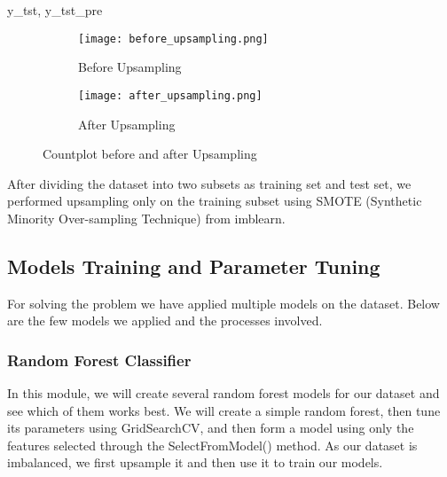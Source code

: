 y_tst, y_tst_pre\documentclass[12pt]{article}
\begin{document}
\begin{figure}[!htb]
     \centering
     \begin{subfigure}[b]{0.3\textwidth}
         \centering
         \texttt{[image: before\_upsampling.png]}
         \caption{Before Upsampling}
         \label{fig:RF}
     \end{subfigure}
     \hfill
     \begin{subfigure}[b]{0.3\textwidth}
         \centering
         \texttt{[image: after\_upsampling.png]}
         \caption{After Upsampling}
         \label{fig:DT}
     \end{subfigure}
     \hfill
     \caption{Countplot before and after Upsampling}
\end{figure}

After dividing the dataset into two subsets as training set and test set, we performed upsampling only on the training subset using SMOTE (Synthetic Minority Over-sampling Technique) from imblearn.


\subsection{Models Training and Parameter Tuning}

For solving the problem we have applied multiple models on the dataset.
Below are the few models we applied and the processes involved.

\subsubsection{Random Forest Classifier}

In this module, we will create several random forest models for our dataset and see which of them works best. We will create a simple random forest, then tune its parameters using GridSearchCV, and then form a model using only the features selected through the SelectFromModel() method. As our dataset is imbalanced, we first upsample it and then use it to train our models.
\end{document}
